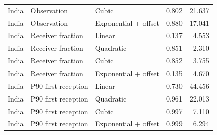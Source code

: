 \begin{table}[p]
\begin{tabularx}{\textwidth}{L{0.15\textwidth}L{0.24\textwidth}Yrr}
India & Observation & Cubic & 0.802 & 21.637 \\
India & Observation & Exponential + offset & 0.880 & 17.041 \\
India & Receiver fraction & Linear & 0.137 & 4.553 \\
India & Receiver fraction & Quadratic & 0.851 & 2.310 \\
India & Receiver fraction & Cubic & 0.852 & 3.755 \\
India & Receiver fraction & Exponential + offset & 0.135 & 4.670 \\
India & P90 first reception & Linear & 0.730 & 44.456 \\
India & P90 first reception & Quadratic & 0.961 & 22.013 \\
India & P90 first reception & Cubic & 0.997 & 7.110 \\
India & P90 first reception & Exponential + offset & 0.999 & 6.294 \\
\bottomrule
\end{tabularx}
\end{table}
